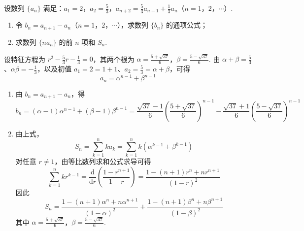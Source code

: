 \begin{problem}
设数列 \(\{a_n\}\) 满足：\(a_1 = 2\)，\(a_2 = \frac{5}{3}\)，\(a_{n+2} = \frac{5}{3} a_{n+1} + \frac{1}{3} a_n\)（\(n = 1\)，\(2\)，\(\cdots\)）.

\begin{enumerate}
\item 令 \(b_n = a_{n+1} - a_n\)（\(n = 1\)，\(2\)，\(\cdots\)），求数列 \(\{b_n\}\) 的通项公式；
\item 求数列 \(\{na_n\}\) 的前 \(n\) 项和 \(S_n\).
\end{enumerate}
\end{problem}

\begin{solution}
设特征方程为 \(r^2-\frac53r-\frac13=0\)，其两个根为
\(\alpha=\frac{5+\sqrt{37}}{6}\)，\(\beta=\frac{5-\sqrt{37}}{6}\).
由 \(\alpha+\beta=\frac53\)、\(\alpha\beta=-\frac13\)，以及初值 \(a_1=2=1+1\)、\(a_2=\frac53=\alpha+\beta\)，可得
\[
a_n=\alpha^{n-1}+\beta^{n-1}
\]

\begin{enumerate}
\item 由 \(b_n=a_{n+1}-a_n\)，得
\[
b_n=(\alpha-1)\alpha^{n-1}+(\beta-1)\beta^{n-1}=\frac{\sqrt{37}-1}{6}\left(\frac{5+\sqrt{37}}{6}\right)^{n-1}-\frac{\sqrt{37}+1}{6}\left(\frac{5-\sqrt{37}}{6}\right)^{n-1}
\]
\item 由上式，
\[
S_n=\sum_{k=1}^{n}ka_k=\sum_{k=1}^{n}k\left(\alpha^{k-1}+\beta^{k-1}\right)
\]
对任意 \(r\ne1\)，由等比数列求和公式求导可得
\[
\sum_{k=1}^{n}kr^{k-1}=\frac{\mathrm d}{\mathrm dr}\left(\frac{1-r^{n+1}}{1-r}\right)=\frac{1-(n+1)r^n+nr^{n+1}}{(1-r)^2}
\]
因此
\[
S_n=\frac{1-(n+1)\alpha^n+n\alpha^{n+1}}{(1-\alpha)^2}+\frac{1-(n+1)\beta^n+n\beta^{n+1}}{(1-\beta)^2}
\]
其中 \(\alpha=\frac{5+\sqrt{37}}{6}\)，\(\beta=\frac{5-\sqrt{37}}{6}\).
\end{enumerate}
\end{solution}
